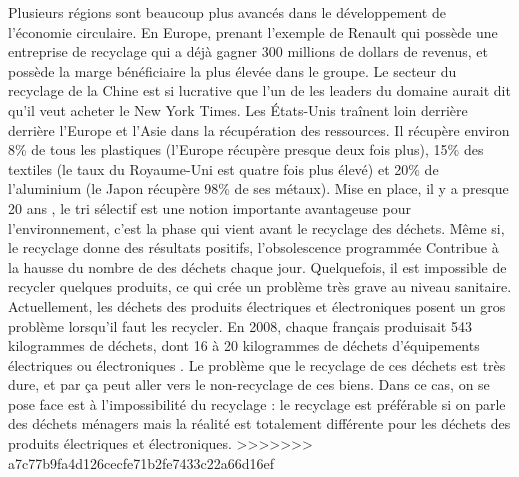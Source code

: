 Plusieurs régions sont beaucoup plus avancés dans le développement de l'économie circulaire. En Europe, prenant l'exemple de Renault qui possède une entreprise de recyclage qui a déjà gagner 300 millions de dollars de revenus, et possède la marge bénéficiaire la plus élevée dans le groupe. Le secteur du recyclage de la Chine est si lucrative que l'un de les leaders du domaine aurait dit qu'il veut acheter le New York Times. 
Les États-Unis traînent loin derrière derrière l'Europe et l'Asie dans la récupération des ressources. Il récupère environ 8\% de tous les plastiques (l'Europe récupère presque deux fois plus), 15\% des textiles (le taux du Royaume-Uni est quatre fois plus élevé) et 20\% de l'aluminium (le Japon récupère 98\% de ses métaux).
Mise en place, il y a presque 20 ans , le tri sélectif est une notion importante avantageuse pour l’environnement, c'est la phase qui vient avant le recyclage des déchets. Même si, le recyclage donne des résultats positifs, l’obsolescence programmée Contribue à la hausse du nombre de des déchets chaque jour. Quelquefois, il est impossible de recycler quelques produits, ce qui crée un problème très grave au niveau sanitaire. 
Actuellement, les déchets des produits électriques et électroniques posent un gros problème lorsqu'il faut les recycler. En 2008, chaque français produisait 543 kilogrammes de déchets, dont 16 à 20 kilogrammes de déchets d’équipements électriques ou électroniques . Le problème que le recyclage de ces déchets est très dure, et par ça peut aller vers le non-recyclage de ces biens. Dans ce cas, on se pose face est à l'impossibilité du recyclage : le recyclage est préférable si on parle des déchets ménagers mais la réalité est totalement différente pour les déchets des produits électriques et électroniques. 
>>>>>>> a7c77b9fa4d126cecfe71b2fe7433c22a66d16ef
